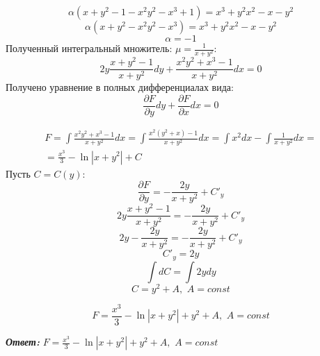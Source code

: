 \documentclass[a5paper, 10pt]{article}
\theoremstyle{definition}
\theoremstyle{plain}
\theoremstyle{remark}
\begin{document}
\begin{equation*}
  {\alpha}(x + y^2 - 1 - x^2y^2-x^3 + 1) =    x^3+y^2x^2 -x-y^2 
\end{equation*}
\begin{equation*}
  {\alpha}(x + y^2  - x^2y^2-x^3 ) =    x^3+y^2x^2 -x-y^2 
\end{equation*}
\begin{equation*}
  {\alpha} = -1
\end{equation*}
Полученный интегральный множитель: $\mu = \frac{1}{x+y^2}$:
\begin{equation*}
2y\frac{x + y^2 - 1}{x+y^2}dy + \frac{x^2y^2+x^3 - 1}{x+y^2} dx = 0
\end{equation*}
Получено уравнение в полных дифференциалах вида:
\begin{equation*}
\frac{\partial F}{\partial y}dy + \frac{\partial F}{\partial x}dx = 0
\end{equation*}

\begin{multline*}
F = \int \frac{x^2y^2+x^3 - 1}{x+y^2} dx = \int \frac{x^2(y^2+x) - 1}{x+y^2} dx = \int x^2 dx - \int \frac{1}{x+y^2} dx =\\
= \frac{x^3}{3} - \ln |x + y^2| + C
\end{multline*}
Пусть $C = C(y)$:
\begin{equation*}
\frac{\partial F}{\partial y} = -\frac{2y}{x + y^2} + C'_y
\end{equation*}
\begin{equation*}
2y\frac{x + y^2 - 1}{x+y^2} =  -\frac{2y}{x + y^2} + C'_y
\end{equation*}
\begin{equation*}
2y - \frac{ 2y}{x+y^2} =  -\frac{2y}{x + y^2} + C'_y
\end{equation*}
\begin{equation*}
  C'_y = 2y
\end{equation*}
\begin{equation*}
\int  dC= \int 2ydy
\end{equation*}
\begin{equation*}
  C = y^2 + A, \, \, A = const
\end{equation*}

\begin{equation*}
F = \frac{x^3}{3} - \ln |x + y^2| +  y^2 + A, \, \, A = const
\end{equation*}

\textit{\textbf{Ответ:}} $F = \frac{x^3}{3} - \ln |x + y^2| +  y^2 + A, \, \, A = const$
\end{document}

